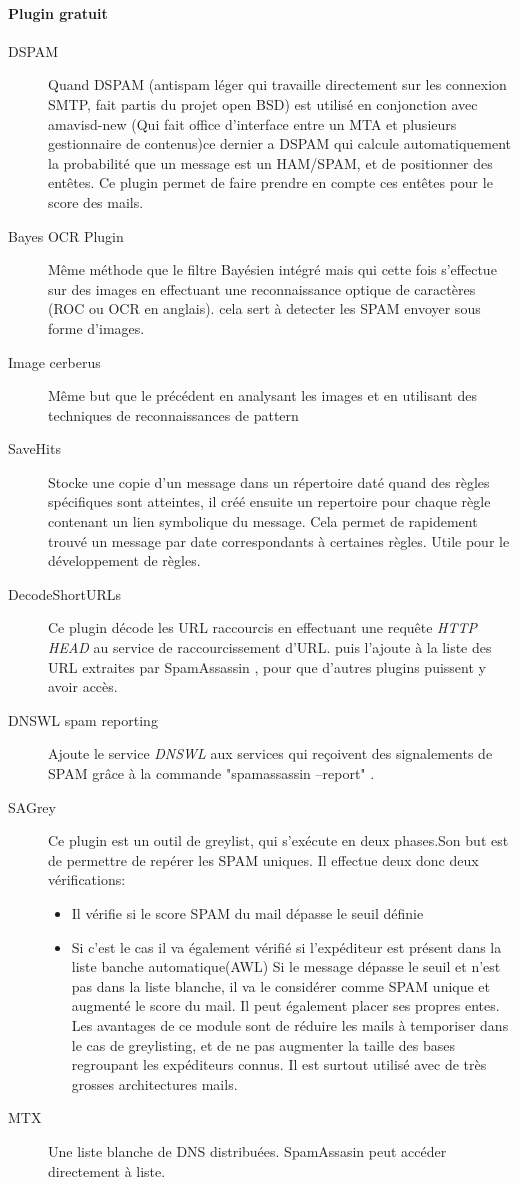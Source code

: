\documentclass[a4paper,11pt]{article}
\begin{document}
\paragraph{Plugin gratuit}
\begin{description}
 \item [DSPAM]Quand DSPAM (antispam léger qui travaille directement sur les connexion SMTP, fait partis du projet open BSD) est utilisé en conjonction avec amavisd-new
 (Qui fait office d'interface entre un MTA et plusieurs gestionnaire de contenus)ce dernier a DSPAM qui calcule automatiquement
 la probabilité que un message est un HAM/SPAM, et de positionner des entêtes. Ce plugin permet de faire prendre en compte 
 ces entêtes pour le score des mails.
 \item [Bayes OCR Plugin] Même méthode que le filtre Bayésien intégré mais qui cette fois s'effectue sur des images en effectuant une reconnaissance 
 optique de caractères (ROC ou OCR en anglais). cela sert à detecter les SPAM envoyer sous forme d'images.
 \item[Image cerberus] Même but que le précédent en analysant les images et en utilisant des techniques de reconnaissances de pattern
 \item[SaveHits]Stocke une copie d'un message dans un répertoire daté quand des règles spécifiques 
 sont atteintes, il créé ensuite un repertoire pour chaque règle contenant un lien symbolique du message.
 Cela permet de rapidement trouvé un message par date correspondants à certaines règles. Utile pour le développement de règles.
 \item [DecodeShortURLs] Ce plugin décode les URL raccourcis en effectuant une requête \emph{HTTP HEAD} au service de raccourcissement d'URL.
 puis l'ajoute à la liste des URL extraites par SpamAssassin , pour que d'autres plugins puissent y avoir accès.
 \item [DNSWL spam reporting] Ajoute le service \emph{DNSWL} aux services qui reçoivent des signalements de SPAM
 grâce à la commande  "spamassassin --report" .
 \item [SAGrey]  Ce plugin est un outil de greylist, qui s’exécute en deux phases.Son but est de permettre 
 de repérer les SPAM uniques. Il effectue deux donc deux vérifications:
 \begin{itemize}
  \item Il vérifie si le score SPAM du mail dépasse le seuil définie
  \item Si c'est le cas il va également vérifié si l’expéditeur est présent dans la liste banche automatique(AWL)
  Si le message dépasse le seuil et n'est pas dans la liste blanche, il va le considérer comme SPAM unique et augmenté le score du mail.
  Il peut également placer ses propres entes. Les avantages de ce module sont de réduire les mails à temporiser dans le cas de greylisting,
  et de ne pas augmenter la taille des bases regroupant les expéditeurs connus. Il est surtout utilisé 
  avec de très grosses architectures mails.
 \end{itemize}

 \item [MTX] Une liste blanche de DNS distribuées. SpamAssasin peut accéder directement à liste.
 \end{description}
\end{document}
